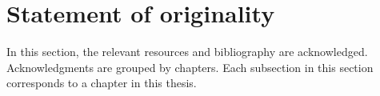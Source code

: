 \section{Statement of originality}
\label{section:appendix:statement}
In this section, the relevant resources and bibliography are acknowledged. Acknowledgments are grouped by chapters.
Each subsection in this section corresponds to a chapter in this thesis.


